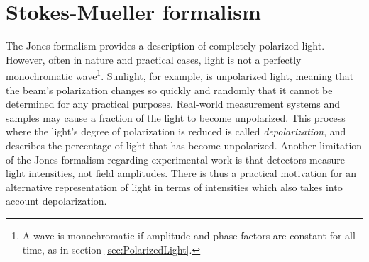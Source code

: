 \section{Stokes-Mueller formalism}
The Jones formalism provides a description of completely polarized light. However, often in nature and practical cases, light is not a perfectly monochromatic wave\footnote{A wave is monochromatic if amplitude and phase factors are constant for all time, as in section \ref{sec:PolarizedLight}.}. Sunlight, for example, is unpolarized light, meaning that the beam's polarization changes so quickly and randomly that it cannot be determined for any practical purposes. Real-world measurement systems and samples may cause a fraction of the light to become unpolarized. This process where the light's degree of polarization is reduced is called \emph{depolarization}, and describes the percentage of light that has become unpolarized\cite{hans_arwin}. Another limitation of the Jones formalism regarding experimental work is that detectors measure light intensities, not field amplitudes. There is thus a practical motivation for an alternative representation of light in terms of intensities which also takes into account depolarization.

